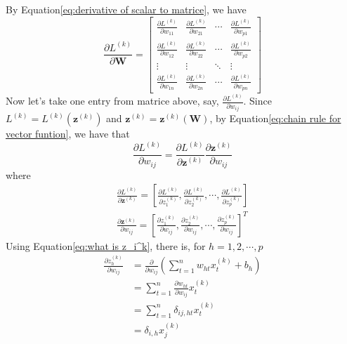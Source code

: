 \documentclass{article}
\newcommand{\Derivative}[2]{\ensuremath{\frac{\partial#1}{\partial#2}}}
\begin{document}
By {\sc Equation}\eqref{eq:derivative of scalar to matrice}, we have
\begin{equation}
    \Derivative{L^{(k)}}{\boldsymbol{W}}=\begin{bmatrix}
        \Derivative{L^{(k)}}{w_{11}}&\Derivative{L^{(k)}}{w_{21}}&\cdots&\Derivative{L^{(k)}}{w_{p1}}\\
        \Derivative{L^{(k)}}{w_{12}}&\Derivative{L^{(k)}}{w_{22}}&\cdots&\Derivative{L^{(k)}}{w_{p2}}\\
        \vdots&\vdots&\ddots&\vdots\\
        \Derivative{L^{(k)}}{w_{1n}}&\Derivative{L^{(k)}}{w_{2n}}&\cdots&\Derivative{L^{(k)}}{w_{pn}} 
    \end{bmatrix}
\end{equation}
Now let's take one entry from matrice above, say, $\Derivative{L^{(k)}}{w_{ij}}$. Since $L^{(k)}=L^{(k)}(\boldsymbol{z}^{(k)})$ and $\boldsymbol{z}^{(k)}=\boldsymbol{z}^{(k)}(\boldsymbol{W})$, by {\sc Equation}\eqref{eq:chain rule for vector funtion}, we have that
\begin{equation}
    \Derivative{L^{(k)}}{w_{ij}}=\Derivative{L^{(k)}}{\boldsymbol{z}^{(k)}}\Derivative{\boldsymbol{z}^{(k)}}{w_{ij}}
\end{equation}
where
\begin{subequations}
    \begin{align}
        \Derivative{L^{(k)}}{\boldsymbol{z}^{(k)}}=\left[
            \Derivative{L^{(k)}}{z^{(k)}_1},
            \Derivative{L^{(k)}}{z^{(k)}_2},
            \cdots,
            \Derivative{L^{(k)}}{z^{(k)}_p}
        \right]\\
        \Derivative{\boldsymbol{z}^{(k)}}{w_{ij}}=\left[
            \Derivative{z^{(k)}_1}{w_{ij}},
            \Derivative{z^{(k)}_2}{w_{ij}},
            \cdots,
            \Derivative{z^{(k)}_p}{w_{ij}}
        \right]^T
    \end{align}
\end{subequations}
Using {\sc Equation}\eqref{eq:what is z_i^k}, there is, for $h=1,2,\cdots,p$
\begin{equation}
    \begin{split}
        \Derivative{z^{(k)}_h}{w_{ij}}
        &=\Derivative{}{w_{ij}}\left(\sum_{t=1}^n w_{ht}x^{(k)}_t+b_h\right)\\
        &=\sum_{t=1}^n \Derivative{w_{ht}}{w_{ij}}x^{(k)}_t\\
        &=\sum_{t=1}^n \delta_{ij,ht}x^{(k)}_t\\
        &=\delta_{i,h}x^{(k)}_j
    \end{split}
\end{equation}
\end{document}
